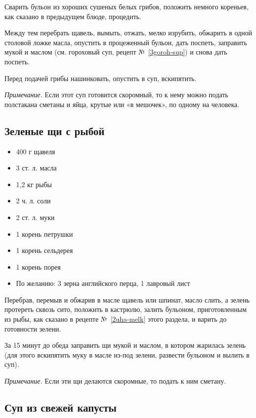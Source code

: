 Сварить бульон из хороших сушеных белых грибов, положить немного кореньев, как сказано в предыдущем блюде, процедить.

Между тем перебрать щавель, вымыть, отжать, мелко изрубить, обжарить в одной столовой ложке масла, опустить в процеженный бульон, дать поспеть, заправить мукой и маслом (см. гороховый суп, рецепт №~\ref{3goroh-sup}) и снова дать поспеть.

Перед подачей грибы нашинковать, опустить в суп, вскипятить.

\emph{Примечание.} Если этот суп готовится скоромный, то к нему можно подать полстакана сметаны и яйца, крутые или «в мешочек», по одному на человека.

\subsection{Зеленые щи с рыбой}\label{8zel-schi-ryb}

\begin{itemize}
	\item 400 г щавеля 
    \item 3 ст. л. масла
    \item 1,2 кг рыбы 
    \item 2 ч. л. соли
    \item 2 ст. л. муки
    \item 1 корень петрушки 
    \item 1 корень сельдерея
    \item 1 корень порея
    \item По желанию: 3 зерна английского перца, 1 лавровый лист
\end{itemize}

Перебрав, перемыв и обжарив в масле щавель или шпинат, масло слить, а зелень протереть сквозь сито, положить в кастрюлю, залить бульоном, приготовленным из рыбы, как сказано в рецепте №~\ref{2uha-melk} этого раздела, и варить до готовности зелени.

За 15 минут до обеда заправить щи мукой и маслом, в котором жарилась зелень (для этого вскипятить муку в масле из-под зелени, развести бульоном и вылить в суп).

\emph{Примечание.} Если эти щи делаются скоромные, то подать к ним сметану.

\subsection{Суп из свежей капусты}\label{9sup-svezh-kap}

